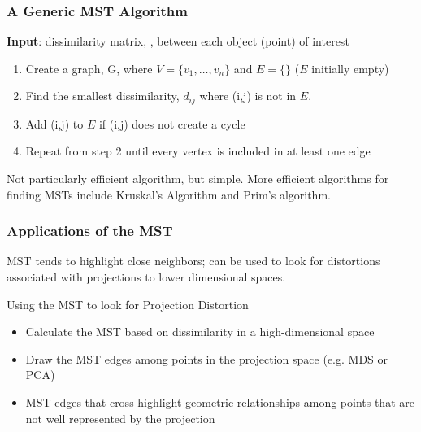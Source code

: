 \documentclass{beamer}
\begin{document}
\begin{frame}
  \frametitle{A Generic MST Algorithm}


\textbf{Input}: dissimilarity matrix, , between each object (point) of interest
\begin{enumerate}
\item Create a graph, G, where  $V = \{v_1,\ldots,v_n\}$ and $E =\{\}$ ($E$ initially empty)
\item Find the smallest dissimilarity, $d_{ij}$ where (i,j) is not in $E$.
\item Add (i,j) to $E$ if (i,j) does not create a cycle
\item Repeat from step 2 until every vertex is included in at least one edge
\end{enumerate}

Not particularly efficient algorithm, but simple. More efficient algorithms for finding MSTs include Kruskal's Algorithm and Prim's algorithm.

\end{frame}

\begin{frame}
  \frametitle{Applications of the MST}

MST tends to highlight close neighbors; can be used to look for distortions associated with projections to lower dimensional spaces.

\begin{block}{Using the MST to look for Projection Distortion}
\begin{itemize}
    \item  Calculate the MST based on dissimilarity in a high-dimensional space
    \item Draw the MST edges among points in the projection space (e.g. MDS or PCA)
    \item MST edges that cross highlight geometric relationships among points that are not well represented by the projection
\end{itemize}
\end{block}
\end{frame}
\end{document}
